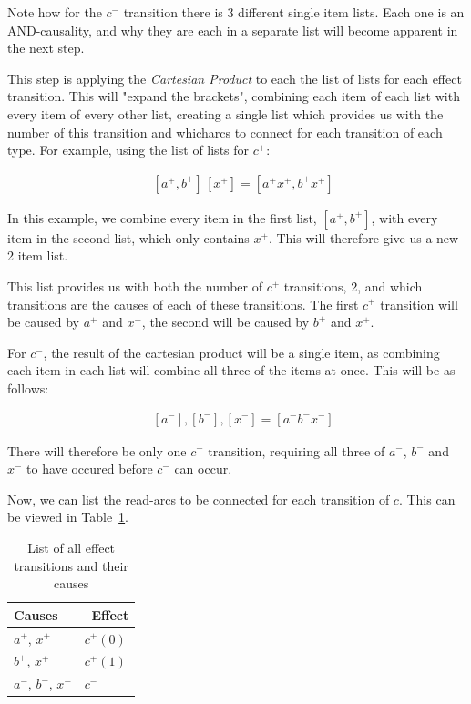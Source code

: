 \documentclass[british,conference,compsoc]{IEEEtran}
\begin{document}
\noindent Note how for the $c^{-}$ transition there is 3 different single item 
lists. Each one is an AND-causality, and why they are each in a separate list
will become apparent in the next step. 

This step is applying the \emph{Cartesian Product} to each the list of lists
for each effect transition. This will "expand the brackets", combining each
item of each list with every item of every other list, creating a single list which
provides us with the number of this transition and  whicharcs to connect 
for each transition of each type. 
For example, using the list of lists for $c^{+}$:

\[
\begin{array}{lcl}
~&[a^{+}, b^{+}]\, [x^{+}] = [a^{+} x^{+}, b^{+} x^{+}]
\end{array}
\]

\noindent In this example, we combine every item in the first list,
$[a^{+}, b^{+}]$, with every item in the second list, which only 
contains $x^{+}$. This will therefore give us a new 2 item list. 

This list provides us with both the number of $c^{+}$ transitions,
2, and which transitions are the causes of each of these transitions.
The first $c^{+}$ transition will be caused by $a^{+}$ and $x^{+}$,
the second will be caused by $b^{+}$ and $x^{+}$. 

For $c^{-}$, the result of the cartesian product will be a single item,
as combining each item in each list will combine all three of the items 
at once. This will be as follows:

\[
\begin{array}{lcl}
~&[a^{-}], [b^{-}], [x^{-}]  = [a^{-} b^{-} x^{-}]
\end{array}
\]

\noindent There will therefore be only one $c^{-}$ transition, requiring all three
of $a^{-}$, $b^{-}$ and $x^{-}$ to have occured before $c^{-}$
can occur. 

Now, we can list the read-arcs to be connected for each transition of $c$.
This can be viewed in Table~\ref{tab:list-by-transition}.

\begin{table}[h]
\caption{List of all effect transitions and their causes\label{tab:list-by-transition}}

  \centering
\begin{tabular}[htb]{| m{2.6cm} | m{2.0cm} |}
  \hline
Causes & \, Effect \\ \hline \hline
$a^{+}$, $x^{+}$ & $c^{+}(0)$ \\ \hline
$b^{+}$, $x^{+}$ & $c^{+}(1)$ \\ \hline
$a^{-}$, $b^{-}$, $x^{-}$ & $c^{-}$ \\ \hline
  \end{tabular}
\end{table}
\end{document}
